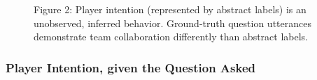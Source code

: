 
\begin{figure}[h!]
    \centering
    \caption{Figure 2: Player intention (represented by abstract labels) is an unobserved, inferred behavior. Ground-truth question utterances demonstrate team collaboration differently than abstract labels.}
\end{figure}









\subsubsection{ Player Intention, given the Question Asked}



